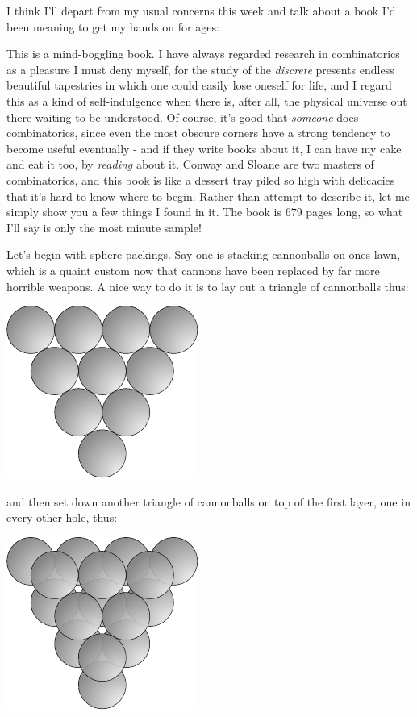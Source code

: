 
I think I'll depart from my usual concerns this week and talk about a book I'd been meaning to get my hands on for ages:


This is a mind-boggling book. I have always regarded research in combinatorics as a pleasure I must deny myself, for the study of the \emph{discrete} presents endless beautiful tapestries in which one could easily lose oneself for life, and I regard this as a kind of self-indulgence when there is, after all, the physical universe out there waiting to be understood. Of course, it's good that \emph{someone} does combinatorics, since even the most obscure corners have a strong tendency to become useful eventually - and if they write books about it, I can have my cake and eat it too, by \emph{reading} about it. Conway and Sloane are two masters of combinatorics, and this book is like a dessert tray piled so high with delicacies that it's hard to know where to begin. Rather than attempt to describe it, let me simply show you a few things I found in it. The book is 679 pages long, so what I'll say is only the most minute sample!

Let's begin with sphere packings. Say one is stacking cannonballs on ones lawn, which is a quaint custom now that cannons have been replaced by far more horrible weapons. A nice way to do it is to lay out a triangle of cannonballs thus:
\begin{center}
\includegraphics[]{figures/wk20_fig1.pdf}
\end{center}
and then set down another triangle of cannonballs on top of the first layer, one in every other hole, thus:
\begin{center}
\includegraphics[]{figures/wk20_fig2.pdf}
\end{center}

